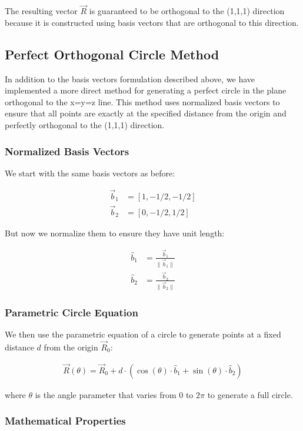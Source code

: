 The resulting vector $\vec{R}$ is guaranteed to be orthogonal to the (1,1,1) direction because it is constructed using basis vectors that are orthogonal to this direction.

\subsection{Perfect Orthogonal Circle Method}

In addition to the basis vectors formulation described above, we have implemented a more direct method for generating a perfect circle in the plane orthogonal to the x=y=z line. This method uses normalized basis vectors to ensure that all points are exactly at the specified distance from the origin and perfectly orthogonal to the (1,1,1) direction.

\subsubsection{Normalized Basis Vectors}

We start with the same basis vectors as before:

\begin{align}
\vec{b}_1 &= [1, -1/2, -1/2] \\
\vec{b}_2 &= [0, -1/2, 1/2]
\end{align}

But now we normalize them to ensure they have unit length:

\begin{align}
\hat{b}_1 &= \frac{\vec{b}_1}{\|\vec{b}_1\|} \\
\hat{b}_2 &= \frac{\vec{b}_2}{\|\vec{b}_2\|}
\end{align}

\subsubsection{Parametric Circle Equation}

We then use the parametric equation of a circle to generate points at a fixed distance $d$ from the origin $\vec{R}_0$:

\begin{align}
\vec{R}(\theta) = \vec{R}_0 + d \cdot (\cos(\theta) \cdot \hat{b}_1 + \sin(\theta) \cdot \hat{b}_2)
\end{align}

where $\theta$ is the angle parameter that varies from 0 to $2\pi$ to generate a full circle.

\subsubsection{Mathematical Properties}

